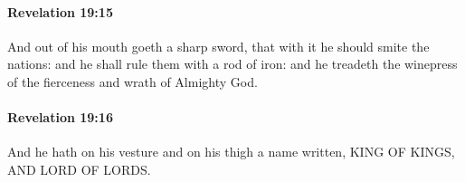 		\paragraph{Revelation 19:15} %
			\label{REVELATIONNT-19-15}

			And out of his mouth goeth a sharp sword, that with it he should smite the nations: and he shall rule them with a rod of iron: and he treadeth the winepress of the fierceness and wrath of Almighty God.

			\begin{framed}
			\scriptsize
				\begin{compactdesc}
					\item[SBLG] 
				\end{compactdesc}
			\end{framed}

		\paragraph{Revelation 19:16} %
			\label{REVELATIONNT-19-16}

			And he hath on his vesture and on his thigh a name written, KING OF KINGS, AND LORD OF LORDS.

